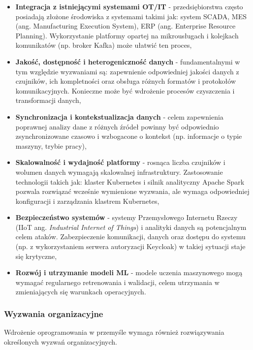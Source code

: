 \begin{itemize}
    \item \textbf{Integracja z istniejącymi systemami OT/IT} - przedsiębiorstwa często posiadają złożone środowiska z systemami takimi jak: system SCADA, MES (ang. Manufacturing Execution System), ERP (ang. Enterprise Resource Planning). Wykorzystanie platformy opartej na mikrousługach i kolejkach komunikatów (np. broker Kafka) może ułatwić ten proces,
    \item \textbf{Jakość, dostępność i heterogeniczność danych} - fundamentalnymi w tym względzie wyzwaniami są:  zapewnienie odpowiedniej jakości danych z czujników, ich kompletności oraz obsługa różnych formatów i protokołów komunikacyjnych. Konieczne może być wdrożenie procesów czyszczenia i transformacji danych,
    \item \textbf{Synchronizacja i kontekstualizacja danych} - celem zapewnienia poprawnej analizy dane z różnych źródeł powinny być odpowiednio zsynchronizowane czasowo i wzbogacone o kontekst (np. informacje o typie maszyny, trybie pracy),
    \item \textbf{Skalowalność i wydajność platformy} - rosnąca liczba czujników i wolumen danych wymagają skalowalnej infrastruktury. Zastosowanie technologii takich jak: klaster Kubernetes i silnik analityczny Apache Spark pozwala rozwiązać wcześnie wymienione wyzwania, ale wymaga odpowiedniej konfiguracji i zarządzania klastrem Kubernetes,
    \item \textbf{Bezpieczeństwo systemów} - systemy Przemysłowego Internetu Rzeczy (IIoT ang. \textit{Industrial Internet of Things}) i analityki danych są potencjalnym celem ataków. Zabezpieczenie komunikacji, danych oraz dostępu do systemu (np. z wykorzystaniem serwera autoryzacji Keycloak) w takiej sytuacji staje się krytyczne,
    \item \textbf{Rozwój i utrzymanie modeli ML} - modele uczenia maszynowego mogą wymagać regularnego retrenowania i walidacji, celem utrzymania w zmieniających się warunkach operacyjnych.
\end{itemize}

\subsubsection{Wyzwania organizacyjne}
\label{subsubsec:wyzwania_organizacyjne}

Wdrożenie oprogramowania w przemyśle wymaga również rozwiązywania określonych wyzwań organizacyjnych.

